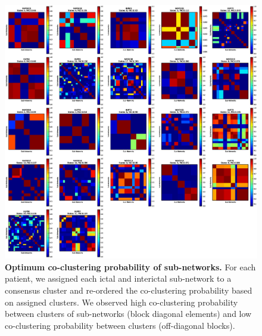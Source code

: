 \begin{figure}[H]
    \includegraphics[width=\textwidth]{assign_true_cluster.eps}
    \caption[Co-clustering probability of ictal and interictal sub-networks]{\textbf{Optimum co-clustering probability of sub-networks.} For each patient, we assigned each ictal and interictal sub-network to a consensus cluster and re-ordered the co-clustering probability based on assigned clusters. We observed high co-clustering probability between clusters of sub-networks (block diagonal elements) and low co-clustering probability between clusters (off-diagonal blocks). \label{ch4:figS3}}
\end{figure}
